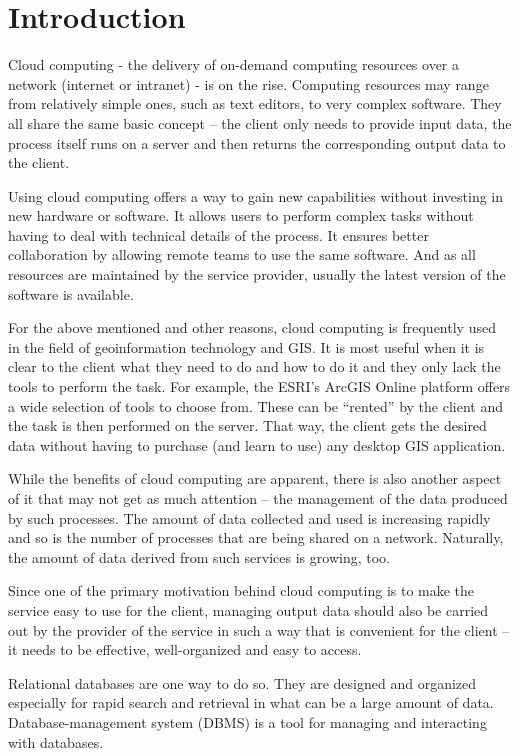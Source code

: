 \chapter{Introduction}
\label{1-introduction}

Cloud computing - the delivery of on-demand computing resources over a
network (internet or intranet) - is on the rise. Computing resources
may range from relatively simple ones, such as text editors, to very
complex software. They all share the same basic concept – the client
only needs to provide input data, the process itself runs on a server
and then returns the corresponding output data to the client.

Using cloud computing offers a way to gain new capabilities without
investing in new hardware or software. It allows users to perform
complex tasks without having to deal with technical details of the
process. It ensures better collaboration by allowing remote teams to
use the same software. And as all resources are maintained by the
service provider, usually the latest version of the software is
available.

For the above mentioned and other reasons, cloud computing is
frequently used in the field of geoinformation technology and GIS. It
is most useful when it is clear to the client what they need to do and
how to do it and they only lack the tools to perform the task. For
example, the ESRI’s ArcGIS Online platform offers a wide selection of
tools to choose from. These can be “rented” by the client and the task
is then performed on the server. That way, the client gets the desired
data without having to purchase (and learn to use) any desktop GIS
application.

While the benefits of cloud computing are apparent, there is also
another aspect of it that may not get as much attention – the
management of the data produced by such processes. The amount of data
collected and used is increasing rapidly and so is the number of
processes that are being shared on a network. Naturally, the amount of
data derived from such services is growing, too.

Since one of the primary motivation behind cloud computing is to make
the service easy to use for the client, managing output data should
also be carried out by the provider of the service in such a way that
is convenient for the client – it needs to be effective,
well-organized and easy to access.

Relational databases are one way to do so. They are designed and
organized especially for rapid search and retrieval in what can be a
large amount of data. Database-management system (DBMS) is a tool for
managing and interacting with databases.
	
